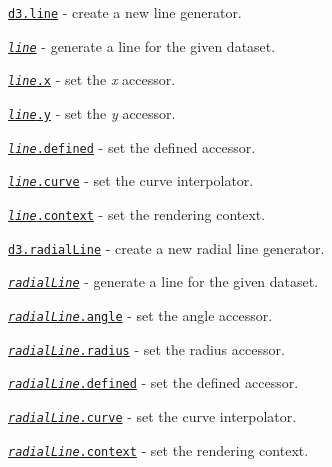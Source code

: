 \begin{DoxyItemize}
\item \href{https://github.com/d3/d3-shape/blob/master/README.md#line}{\tt d3.\+line} -\/ create a new line generator.
\item \href{https://github.com/d3/d3-shape/blob/master/README.md#_line}{\tt {\itshape line}} -\/ generate a line for the given dataset.
\item \href{https://github.com/d3/d3-shape/blob/master/README.md#line_x}{\tt {\itshape line}.x} -\/ set the {\itshape x} accessor.
\item \href{https://github.com/d3/d3-shape/blob/master/README.md#line_y}{\tt {\itshape line}.y} -\/ set the {\itshape y} accessor.
\item \href{https://github.com/d3/d3-shape/blob/master/README.md#line_defined}{\tt {\itshape line}.defined} -\/ set the defined accessor.
\item \href{https://github.com/d3/d3-shape/blob/master/README.md#line_curve}{\tt {\itshape line}.curve} -\/ set the curve interpolator.
\item \href{https://github.com/d3/d3-shape/blob/master/README.md#line_context}{\tt {\itshape line}.context} -\/ set the rendering context.
\item \href{https://github.com/d3/d3-shape/blob/master/README.md#radialLine}{\tt d3.\+radial\+Line} -\/ create a new radial line generator.
\item \href{https://github.com/d3/d3-shape/blob/master/README.md#_radialLine}{\tt {\itshape radial\+Line}} -\/ generate a line for the given dataset.
\item \href{https://github.com/d3/d3-shape/blob/master/README.md#radialLine_angle}{\tt {\itshape radial\+Line}.angle} -\/ set the angle accessor.
\item \href{https://github.com/d3/d3-shape/blob/master/README.md#radialLine_radius}{\tt {\itshape radial\+Line}.radius} -\/ set the radius accessor.
\item \href{https://github.com/d3/d3-shape/blob/master/README.md#radialLine_defined}{\tt {\itshape radial\+Line}.defined} -\/ set the defined accessor.
\item \href{https://github.com/d3/d3-shape/blob/master/README.md#radialLine_curve}{\tt {\itshape radial\+Line}.curve} -\/ set the curve interpolator.
\item \href{https://github.com/d3/d3-shape/blob/master/README.md#radialLine_context}{\tt {\itshape radial\+Line}.context} -\/ set the rendering context.
\end{DoxyItemize}

